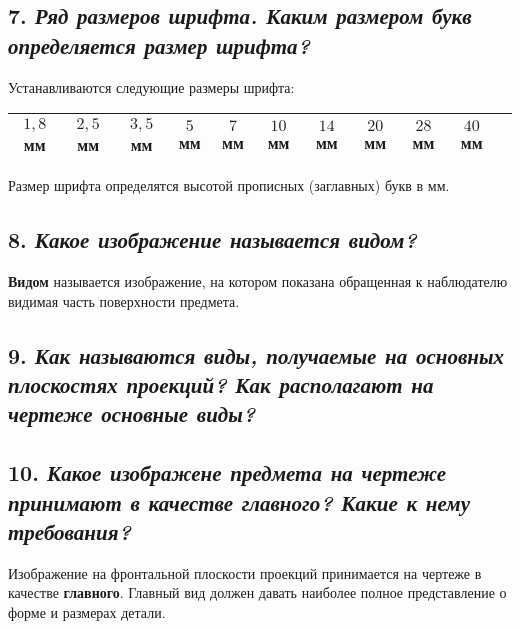 \subsection*{7. \textit{Ряд размеров шрифта. Каким размером букв определяется размер шрифта?}}

Устанавливаются следующие размеры шрифта:
\begin{center}
\begin{tabular}{|c|c|c|c|c|c|c|c|c|c|c|}
\hline




$1,8$мм&$2,5$мм&$3,5$мм&$5$мм&$7$мм&$10$мм&$14$мм&$20$мм&$28$мм&$40$мм\\ \hline

\hline
\end{tabular}
\end{center}

Размер шрифта определятся высотой прописных (заглавных) букв в мм.
\subsection*{8. \textit{Какое изображение называется видом?}}

\textbf{Видом} называется изображение, на котором показана обращенная к наблюдателю видимая часть поверхности предмета.
\subsection*{9. \textit{Как называются виды, получаемые на основных плоскостях проекций? Как располагают на чертеже основные виды?}}



\subsection*{10. \textit{Какое изображене предмета на чертеже принимают в качестве главного? Какие к нему требования?}}

Изображение на фронтальной плоскости проекций принимается на чертеже в качестве {\bf главного}. Главный вид должен давать наиболее полное представление о форме и размерах детали.

